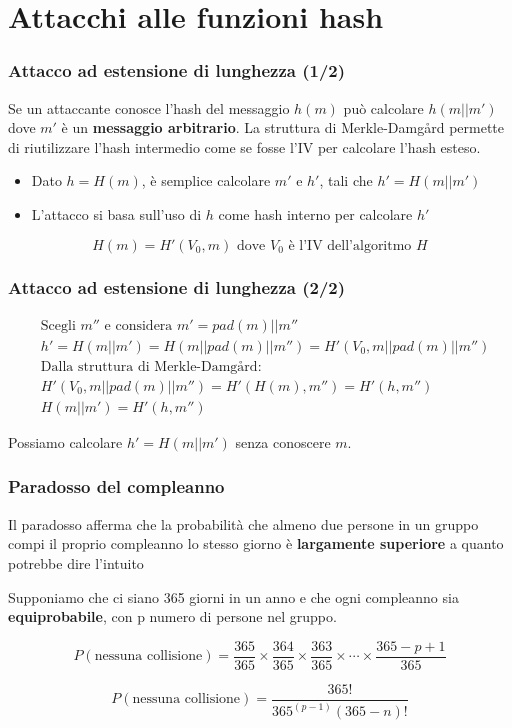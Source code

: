 \section{Attacchi alle funzioni hash}


\begin{frame}
	\frametitle{Attacco ad estensione di lunghezza (1/2)}
	Se un attaccante conosce l'hash del messaggio \( h(m) \) può calcolare \( h(m || m') \) dove \( m' \) è un \textbf{messaggio arbitrario}.
	La struttura di Merkle-Damgård permette di riutilizzare l'hash intermedio come se fosse l'IV per calcolare l'hash esteso.

	\vspace{0.5cm}
	\begin{itemize}
		\item Dato \(h = H(m)\), è semplice calcolare \(m'\) e \(h'\), tali che \(h' = H(m||m')\)
		\item L'attacco si basa sull'uso di \(h\) come hash interno per calcolare \(h'\)
	\end{itemize}

	\vspace{0.5cm}
	\[
		H(m) = H'(V_0, m) \text{ dove } V_0 \text{ è l'IV dell'algoritmo } H
	\]
\end{frame}

\begin{frame}
	\frametitle{Attacco ad estensione di lunghezza (2/2)}

	\begin{align*}
		 & \text{Scegli } m'' \text{ e considera } m' = pad(m)||m''    \\
		 & h' = H(m||m') = H(m||pad(m)||m'') = H'(V_0, m||pad(m)||m'') \\
		 & \text{Dalla struttura di Merkle-Damgård:}                   \\
		 & H'(V_0, m||pad(m)||m'') = H'(H(m), m'') = H'(h, m'')        \\
		 & H(m||m') = H'(h, m'')
	\end{align*}

	\vspace{0.5cm}
	Possiamo calcolare \(h' = H(m||m')\) senza conoscere \(m\).
\end{frame}


\begin{frame}
	\frametitle{Paradosso del compleanno}

	Il paradosso afferma che la probabilità che almeno due persone in un gruppo compi il proprio compleanno lo stesso giorno è \textbf{largamente superiore} a quanto potrebbe dire l'intuito

	Supponiamo che ci siano 365 giorni in un anno e che ogni compleanno sia \textbf{equiprobabile}, con p numero di persone nel gruppo.

	\[
		P(\text{nessuna collisione}) = \frac{365}{365} \times \frac{364}{365} \times \frac{363}{365} \times \cdots \times \frac{365 - p + 1}{365}
	\]

	\[
		P(\text{nessuna collisione}) = \frac{365!}{365^(p-1) (365 - n)!}
	\]

\end{frame}

